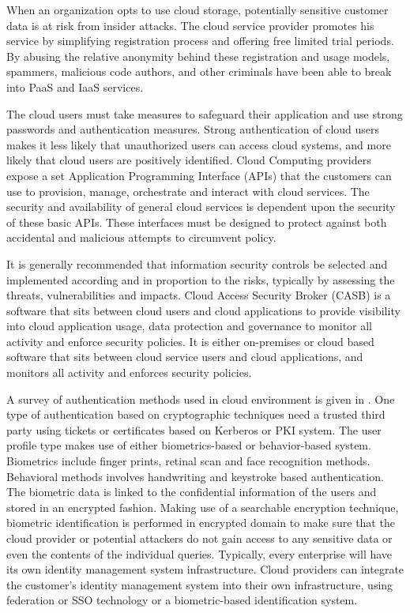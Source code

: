 \begin{multicols}{2}
When an organization opts to use cloud storage, potentially sensitive customer data is at risk from insider attacks. The cloud service provider promotes his service by simplifying registration process and offering free limited trial periods. By abusing the relative anonymity behind these registration and usage models, spammers, malicious code authors, and other criminals have been able to break into PaaS and IaaS services. 

The cloud users must take measures to safeguard their application and use strong passwords and authentication measures. Strong authentication of cloud users makes it less likely that unauthorized users can access cloud systems, and more likely that cloud users are positively identified. Cloud Computing providers expose a set Application Programming Interface (APIs) that the customers can use to provision, manage, orchestrate and interact with cloud services. The security and availability of general cloud services is dependent upon the security of these basic APIs. These interfaces must be designed to protect against both accidental and malicious attempts to circumvent policy.

It is generally recommended that information security controls be selected and implemented according and in proportion to the risks, typically by assessing the threats, vulnerabilities and impacts. Cloud Access Security Broker (CASB) is a software that sits between cloud users and cloud applications to provide visibility into cloud application usage, data protection and governance to monitor all activity and enforce security policies. It is either on-premises or cloud based software that sits between cloud service users and cloud applications, and monitors all activity and enforces security policies. 

A survey of authentication methods used in cloud environment is given in \cite{chap2-key18}. One type of authentication based on cryptographic techniques need a trusted third party using tickets or certificates based on Kerberos or PKI system. The user profile type makes use of either biometrics-based or behavior-based system. Biometrics include finger prints, retinal scan and face recognition methods. Behavioral methods involves handwriting and keystroke based authentication. The biometric data is linked to the confidential information of the users and stored in an encrypted fashion. Making use of a searchable encryption technique, biometric identification is performed in encrypted domain to make sure that the cloud provider or potential attackers do not gain access to any sensitive data or even the contents of the individual queries. Typically, every enterprise will have its own identity management system infrastructure. Cloud providers can integrate the customer's identity management system into their own infrastructure, using federation or SSO technology or a biometric-based identification system.


\end{multicols}
